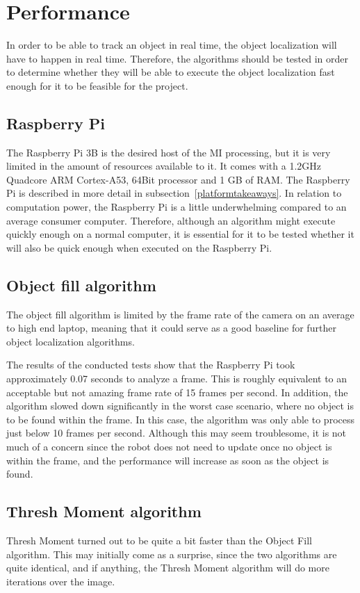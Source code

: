 \section{Performance}
In order to be able to track an object in real time, the object localization will have to happen in real time.
Therefore, the algorithms should be tested in order to determine whether they will be able to execute the object localization fast enough for it to be feasible for the project.

\subsection{Raspberry Pi}
The Raspberry Pi 3B is the desired host of the MI processing, but it is very limited in the amount of resources available to it.
It comes with a 1.2GHz Quadcore ARM Cortex-A53, 64Bit processor and 1 GB of RAM.
The Raspberry Pi is described in more detail in subsection~\ref{platformtakeaways}.
In relation to computation power, the Raspberry Pi is a little underwhelming compared to an average consumer computer.
Therefore, although an algorithm might execute quickly enough on a normal computer, it is essential for it to be tested whether it will also be quick enough when executed on the Raspberry Pi.

\subsection{Object fill algorithm}
The object fill algorithm is limited by the frame rate of the camera on an average to high end laptop, meaning that it could serve as a good baseline for further object localization algorithms.

The results of the conducted tests show that the Raspberry Pi took approximately 0.07 seconds to analyze a frame.
This is roughly equivalent to an acceptable but not amazing frame rate of 15 frames per second.
In addition, the algorithm slowed down significantly in the worst case scenario, where no object is to be found within the frame.
In this case, the algorithm was only able to process just below 10 frames per second.
Although this may seem troublesome, it is not much of a concern since the robot does not need to update once no object is within the frame, and the performance will increase as soon as the object is found.

\subsection{Thresh Moment algorithm}
Thresh Moment turned out to be quite a bit faster than the Object Fill algorithm.
This may initially come as a surprise, since the two algorithms are quite identical, and if anything, the Thresh Moment algorithm will do more iterations over the image.

